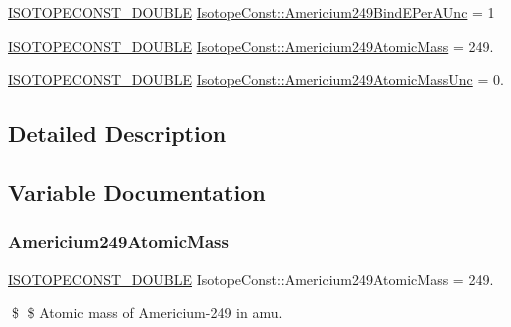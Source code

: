 \begin{DoxyCompactItemize}
\mbox{\hyperlink{group___isotope_const-_macros_ga8f45a7272ce02c0b4c65c44636ed719a}{I\+S\+O\+T\+O\+P\+E\+C\+O\+N\+S\+T\+\_\+\+D\+O\+U\+B\+LE}} \mbox{\hyperlink{group___isotope_const-_americium-_am249_gad5111cb01b55b04943c69bb1e3f70b6a}{Isotope\+Const\+::\+Americium249\+Bind\+E\+Per\+A\+Unc}} = 1
\item 
\mbox{\hyperlink{group___isotope_const-_macros_ga8f45a7272ce02c0b4c65c44636ed719a}{I\+S\+O\+T\+O\+P\+E\+C\+O\+N\+S\+T\+\_\+\+D\+O\+U\+B\+LE}} \mbox{\hyperlink{group___isotope_const-_americium-_am249_gaeb4cea26e38acf220949cc67f8d36bc4}{Isotope\+Const\+::\+Americium249\+Atomic\+Mass}} = 249.
\item 
\mbox{\hyperlink{group___isotope_const-_macros_ga8f45a7272ce02c0b4c65c44636ed719a}{I\+S\+O\+T\+O\+P\+E\+C\+O\+N\+S\+T\+\_\+\+D\+O\+U\+B\+LE}} \mbox{\hyperlink{group___isotope_const-_americium-_am249_ga013cdde608cda00c6663afb22824929c}{Isotope\+Const\+::\+Americium249\+Atomic\+Mass\+Unc}} = 0.
\end{DoxyCompactItemize}


\subsection{Detailed Description}


\subsection{Variable Documentation}
\mbox{\label{group___isotope_const-_americium-_am249_gaeb4cea26e38acf220949cc67f8d36bc4}} 
\subsubsection{\texorpdfstring{Americium249\+Atomic\+Mass}{Americium249AtomicMass}}
{\footnotesize\ttfamily \mbox{\hyperlink{group___isotope_const-_macros_ga8f45a7272ce02c0b4c65c44636ed719a}{I\+S\+O\+T\+O\+P\+E\+C\+O\+N\+S\+T\+\_\+\+D\+O\+U\+B\+LE}} Isotope\+Const\+::\+Americium249\+Atomic\+Mass = 249.}

\$ \$ Atomic mass of Americium-\/249 in amu. \mbox{\label{group___isotope_const-_americium-_am249_ga013cdde608cda00c6663afb22824929c}} 
